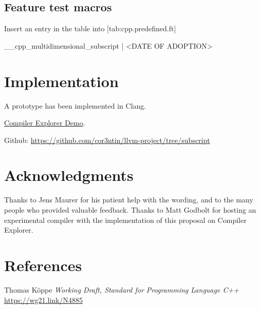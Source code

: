 \documentclass{wg21}
\begin{document}
\subsection{Feature test macros}

Insert an entry in the table into [tab:cpp.predefined.ft]

\begin{addedblock}
\begin{codeblock}
__cpp_multidimensional_subscript | <DATE OF ADOPTION>
\end{codeblock}
\end{addedblock}

\section{Implementation}

A prototype has been implemented in Clang.

\href{https://gcc.godbolt.org/z/4szfLo}{Compiler Explorer Demo}.

Github: \url{https://github.com/cor3ntin/llvm-project/tree/subscript}

\section{Acknowledgments}

Thanks to Jens Maurer for his patient help with the wording, and to the many people who provided valuable feedback.
Thanks to Matt Godbolt for hosting an experimental compiler with the implementation
of this proposal on Compiler Explorer.

\section{References}
\renewcommand{\section}[2]{}%



\begin{thebibliography}{9}

    Thomas Köppe
    \emph{Working Draft, Standard for Programming Language C++}\newline
    \url{https://wg21.link/N4885}

\end{thebibliography}
\end{document}
